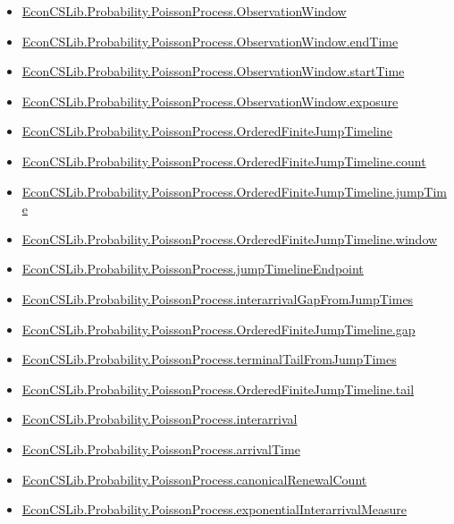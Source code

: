 \documentclass[10pt]{article}
\begin{document}
\begin{itemize}[leftmargin=1.2em]
\begin{itemize}[leftmargin=1.2em]
\item \hyperlink{library-prerequisite-9ad92606d7fa59cb}{EconCSLib.Probability.PoissonProcess.ObservationWindow}
\item \hyperlink{library-prerequisite-c70e08c3ac410ca6}{EconCSLib.Probability.PoissonProcess.ObservationWindow.endTime}
\item \hyperlink{library-prerequisite-f15f0784878bc71d}{EconCSLib.Probability.PoissonProcess.ObservationWindow.startTime}
\item \hyperlink{library-prerequisite-3328071bd9f44724}{EconCSLib.Probability.PoissonProcess.ObservationWindow.exposure}
\item \hyperlink{library-prerequisite-2620d428908f704b}{EconCSLib.Probability.PoissonProcess.OrderedFiniteJumpTimeline}
\item \hyperlink{library-prerequisite-f87260094f2ac2ab}{EconCSLib.Probability.PoissonProcess.OrderedFiniteJumpTimeline.count}
\item \hyperlink{library-prerequisite-65f7fdefc9841ed7}{EconCSLib.Probability.PoissonProcess.OrderedFiniteJumpTimeline.jumpTime}
\item \hyperlink{library-prerequisite-6cc0ed6fd9adc210}{EconCSLib.Probability.PoissonProcess.OrderedFiniteJumpTimeline.window}
\item \hyperlink{library-prerequisite-d5714942afcae7ea}{EconCSLib.Probability.PoissonProcess.jumpTimelineEndpoint}
\item \hyperlink{library-prerequisite-61c8fc5493abc85c}{EconCSLib.Probability.PoissonProcess.interarrivalGapFromJumpTimes}
\item \hyperlink{library-prerequisite-60bb82d84ffc203f}{EconCSLib.Probability.PoissonProcess.OrderedFiniteJumpTimeline.gap}
\item \hyperlink{library-prerequisite-944c30434e13b4f4}{EconCSLib.Probability.PoissonProcess.terminalTailFromJumpTimes}
\item \hyperlink{library-prerequisite-7d66318da2689eed}{EconCSLib.Probability.PoissonProcess.OrderedFiniteJumpTimeline.tail}
\item \hyperlink{library-prerequisite-1b9cfca26b5fed3e}{EconCSLib.Probability.PoissonProcess.interarrival}
\item \hyperlink{library-prerequisite-6b287d7b0b847c32}{EconCSLib.Probability.PoissonProcess.arrivalTime}
\item \hyperlink{library-prerequisite-8505e69fd88d7b34}{EconCSLib.Probability.PoissonProcess.canonicalRenewalCount}
\item \hyperlink{library-prerequisite-d4d7918345e75db1}{EconCSLib.Probability.PoissonProcess.exponentialInterarrivalMeasure}

\end{itemize}
\end{itemize}
\end{document}
